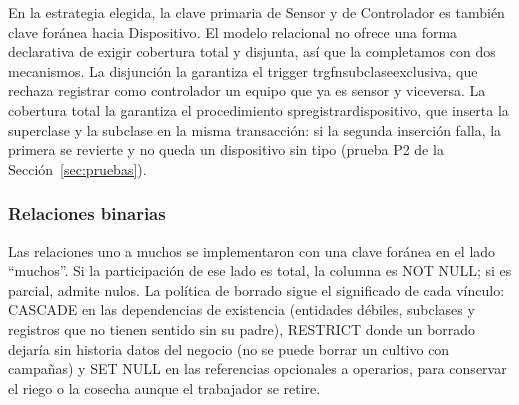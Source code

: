 \documentclass[11pt,letterpaper]{article}
\newcommand{\tbus}{\textunderscore\allowbreak}
\newcommand{\tb}[1]{{\ttfamily\let\_\tbus #1}}
\begin{document}
En la estrategia elegida, la clave primaria de \tb{Sensor} y de \tb{Controlador} es también clave foránea hacia \tb{Dispositivo}. El modelo relacional no ofrece una forma declarativa de exigir cobertura total y disjunta, así que la completamos con dos mecanismos. La disjunción la garantiza el trigger \tb{trg\_fn\_subclase\_exclusiva}, que rechaza registrar como controlador un equipo que ya es sensor y viceversa. La cobertura total la garantiza el procedimiento \tb{sp\_registrar\_dispositivo}, que inserta la superclase y la subclase en la misma transacción: si la segunda inserción falla, la primera se revierte y no queda un dispositivo sin tipo (prueba P2 de la Sección~\ref{sec:pruebas}).

\subsubsection{Relaciones binarias}

Las relaciones uno a muchos se implementaron con una clave foránea en el lado ``muchos''. Si la participación de ese lado es total, la columna es \tb{NOT NULL}; si es parcial, admite nulos. La política de borrado sigue el significado de cada vínculo: \tb{CASCADE} en las dependencias de existencia (entidades débiles, subclases y registros que no tienen sentido sin su padre), \tb{RESTRICT} donde un borrado dejaría sin historia datos del negocio (no se puede borrar un cultivo con campañas) y \tb{SET NULL} en las referencias opcionales a operarios, para conservar el riego o la cosecha aunque el trabajador se retire.
\end{document}
